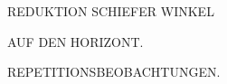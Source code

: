 \par\clearpage
\vspace*{4cm}
\begin{center}
{\fontsize{22}{30}\selectfont
REDUKTION SCHIEFER WINKEL\par
AUF DEN HORIZONT.\par
REPETITIONSBEOBACHTUNGEN.\par}
\end{center}
\vspace{8.2cm}
\noindent\makebox[.86\linewidth][r]{64\textsuperscript{*}}\par
